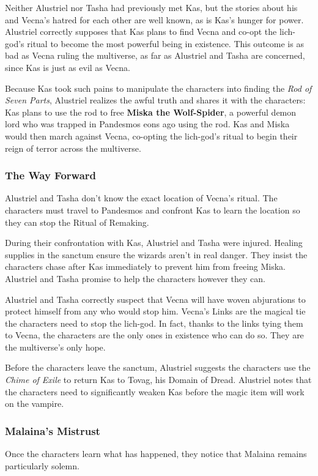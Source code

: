 \documentclass[10pt,a4paper,twoside,bg=print,twocolumn,openany,nodeprecatedcode]{dndbook}
\begin{document}
Neither Alustriel nor Tasha had previously met Kas, but the stories about his and Vecna's hatred for each other are well known, as is Kas's hunger for power. Alustriel correctly supposes that Kas plans to find Vecna and co-opt the lich-god's ritual to become the most powerful being in existence. This outcome is as bad as Vecna ruling the multiverse, as far as Alustriel and Tasha are concerned, since Kas is just as evil as Vecna.

Because Kas took such pains to manipulate the characters into finding the \textit{Rod of Seven Parts}, Alustriel realizes the awful truth and shares it with the characters: Kas plans to use the rod to free \textbf{Miska the Wolf-Spider}, a powerful demon lord who was trapped in Pandesmos eons ago using the rod. Kas and Miska would then march against Vecna, co-opting the lich-god's ritual to begin their reign of terror across the multiverse.

\subsubsection{The Way Forward}
Alustriel and Tasha don't know the exact location of Vecna's ritual. The characters must travel to Pandesmos and confront Kas to learn the location so they can stop the Ritual of Remaking.

During their confrontation with Kas, Alustriel and Tasha were injured. Healing supplies in the sanctum ensure the wizards aren't in real danger. They insist the characters chase after Kas immediately to prevent him from freeing Miska. Alustriel and Tasha promise to help the characters however they can.

Alustriel and Tasha correctly suspect that Vecna will have woven abjurations to protect himself from any who would stop him. Vecna's Links are the magical tie the characters need to stop the lich-god. In fact, thanks to the links tying them to Vecna, the characters are the only ones in existence who can do so. They are the multiverse's only hope.

Before the characters leave the sanctum, Alustriel suggests the characters use the \textit{Chime of Exile} to return Kas to Tovag, his Domain of Dread. Alustriel notes that the characters need to significantly weaken Kas before the magic item will work on the vampire.

\subsubsection{Malaina's Mistrust}
Once the characters learn what has happened, they notice that Malaina remains particularly solemn.
\end{document}

